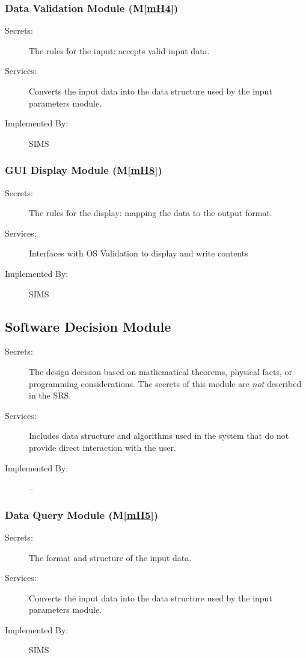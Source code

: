 \documentclass[12pt, titlepage]{article}
\newcommand{\mref}[1]{M\ref{#1}}
\begin{document}
\subsubsection{Data Validation Module (\mref{mH4})}
\begin{description}
\item[Secrets:]The rules for the input: accepts valid input data.
\item[Services:]Converts the input data into the data structure used by the
  input parameters module.
\item[Implemented By:] SIMS
\end{description}

\subsubsection{GUI Display Module (\mref{mH8})}
\begin{description}
\item[Secrets:]The rules for the display: mapping the data to the output format.
\item[Services:]Interfaces with OS Validation to display and write contents
\item[Implemented By:] SIMS
\end{description}

\subsection{Software Decision Module}

\begin{description}
\item[Secrets:] The design decision based on mathematical theorems, physical
  facts, or programming considerations. The secrets of this module are
  \emph{not} described in the SRS.
\item[Services:] Includes data structure and algorithms used in the system that
  do not provide direct interaction with the user. 

\item[Implemented By:] --
\end{description}

\subsubsection{Data Query Module (\mref{mH5})}
\begin{description}
\item[Secrets:]The format and structure of the input data. 
\item[Services:]Converts the input data into the data structure used by the
  input parameters module.
\item[Implemented By:] SIMS
\end{description}
\end{document}

